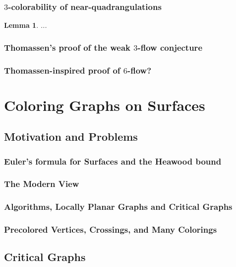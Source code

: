 \documentclass[12pt,twoside,openright,a4paper]{book}
\newtheorem{lemma}[theorem]{Lemma}
\begin{document}
\section{$3$-colorability of near-quadrangulations}

\begin{lemma}\label{lemma:flow-quadr}
...
\end{lemma}

\section{Thomassen's proof of the weak $3$-flow conjecture}
\section{Thomassen-inspired proof of $6$-flow?}

\part{Coloring Graphs on Surfaces}

\chapter{Motivation and Problems}


\section{Euler's formula for Surfaces and the Heawood bound}\label{sec:heawood}

\section{The Modern View}

\section{Algorithms, Locally Planar Graphs and Critical Graphs}

\section{Precolored Vertices, Crossings, and Many Colorings}

\chapter{Critical Graphs}
\end{document}
